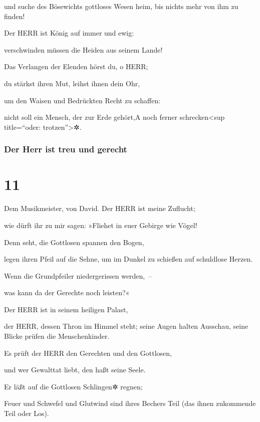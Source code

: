 und suche des Bösewichts gottloses Wesen heim, bis nichts mehr von ihm
zu finden!

Der HERR ist König auf immer und ewig:

verschwinden müssen die Heiden aus seinem Lande!

Das Verlangen der Elenden hörst du, o HERR;

du stärkst ihren Mut, leihst ihnen dein Ohr,

um den Waisen und Bedrückten Recht zu schaffen:

nicht soll ein Mensch, der zur Erde gehört,{A} noch ferner
schrecken\textless sup title=``oder: trotzen''\textgreater✲.

\hypertarget{der-herr-ist-treu-und-gerecht}{%
\subsubsection{Der Herr ist treu und
gerecht}\label{der-herr-ist-treu-und-gerecht}}

\hypertarget{section-10}{%
\section{11}\label{section-10}}

Dem Musikmeister, von David. Der HERR ist meine Zuflucht;

wie dürft ihr zu mir sagen: »Fliehet in euer Gebirge wie Vögel!

Denn seht, die Gottlosen spannen den Bogen,

legen ihren Pfeil auf die Sehne, um im Dunkel zu schießen auf schuldlose
Herzen.

Wenn die Grundpfeiler niedergerissen werden,~--

was kann da der Gerechte noch leisten?«

Der HERR ist in seinem heiligen Palast,

der HERR, dessen Thron im Himmel steht; seine Augen halten Ausschau,
seine Blicke prüfen die Menschenkinder.

Es prüft der HERR den Gerechten und den Gottlosen,

und wer Gewalttat liebt, den haßt seine Seele.

Er läßt auf die Gottlosen Schlingen✲ regnen;

Feuer und Schwefel und Glutwind sind ihres Bechers Teil (das ihnen
zukommende Teil oder Los).

